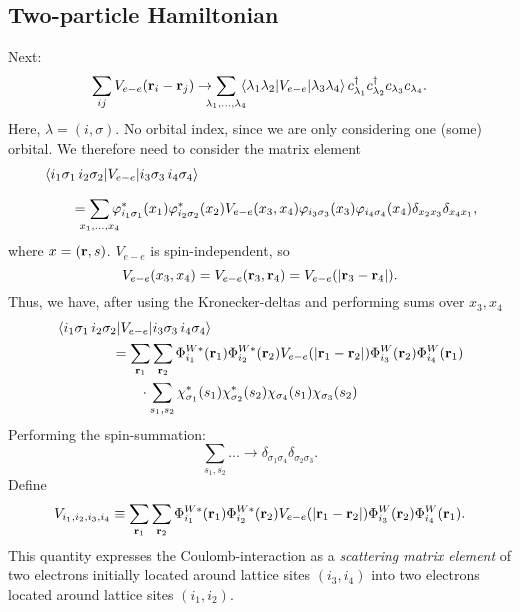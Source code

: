 \subsection{Two-particle Hamiltonian}
Next:
\begin{equation}
	\sum_{ij}V_{e-e}(\vb{r}_i - \vb{r}_{j}) \rightarrow \sum_{\mathclap{\lambda_1,\dots, \lambda_{4}}}\mel{\lambda_1\lambda_2}{V_{e-e}}{\lambda_3\lambda_4}\cd_{\lambda_1}\cd_{\lambda_2}c_{\lambda_3}c_{\lambda_4}.
\end{equation}
Here, $\lambda = (i,\sigma)$. No orbital index, since we are only considering one (some) orbital. We therefore need to consider the matrix element
\begin{align*}
	&\mel{i_1\sigma_1\, i_2\sigma_2}{V_{e-e}}{i_3\sigma_3\, i_4\sigma_4} \\[1.5ex]
	&\qquad = \sum_{\mathclap{x_1,\dots,x_4}}\p_{i_1\sigma_1}^*(x_1)\p_{i_2\sigma_2}^*(x_2)V_{e-e}(x_3,x_4)\p_{i_3\sigma_3}(x_3)\p_{i_4\sigma_4}(x_4)\delta_{x_2x_3}\delta_{x_4x_1},
\end{align*}
where $x = (\vb r, s)$.
$V_{e-e}$ is spin-independent, so 
\begin{equation}
	V_{e-e}(x_3, x_4) = V_{e-e}(\vb{r}_3, \vb{r}_4) = V_{e-e}(|\vb{r}_3-\vb{r}_4|).
\end{equation}
Thus, we have, after using the Kronecker-deltas and performing sums over $x_3, x_4$
\begin{align*}
	&\mel{i_1\sigma_1\, i_2\sigma_2}{V_{e-e}}{i_3\sigma_3\, i_4\sigma_4}\\
	&\qquad\qquad = \sum_{\vb{r}_1}\sum_{\vb{r}_2} \Phi_{i_1}^{W*}(\vb r_1)\Phi_{i_2}^{W*}(\vb r_2)V_{e-e}(|\vb{r}_1-\vb{r}_2|)\Phi_{i_3}^{W}(\vb r_2)\Phi_{i_4}^{W}(\vb r_1) \\
	&\qquad\qquad \qquad \cdot \sum_{s_1,s_2}\chi_{\sigma_1}^*(s_1)\chi_{\sigma_2}^*(s_2)\chi_{\sigma_4}(s_1)\chi_{\sigma_3}(s_2)
\end{align*}
Performing the spin-summation:
\begin{equation}
	\sum_{s_1, s_2}\dots \rightarrow \delta_{\sigma_1\sigma_4}\delta_{\sigma_2\sigma_3}.
\end{equation}
Define
\begin{equation}\label{eq:def_Vijkl}
	V_{i_1, i_2, i_3, i_4} \equiv \sum_{\vb{r}_1}\sum_{\vb{r}_2} \Phi_{i_1}^{W*}(\vb r_1)\Phi_{i_2}^{W*}(\vb r_2)V_{e-e}(|\vb{r}_1-\vb{r}_2|)\Phi_{i_3}^{W}(\vb r_2)\Phi_{i_4}^{W}(\vb r_1).
\end{equation}
This quantity expresses the Coulomb-interaction as a \emph{scattering matrix element} of two electrons initially located around lattice sites $(i_3, i_4)$ into two electrons located around lattice sites $(i_1, i_2)$.

